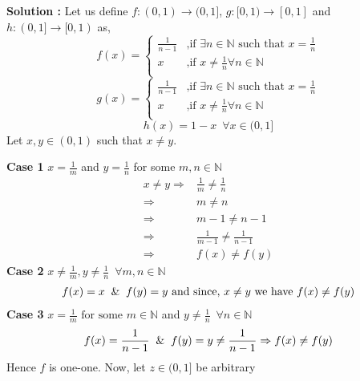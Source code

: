 \documentclass[10pt]{article}
\newcommand{\nn}{\mathbb{N}}
\begin{document}
\begin{enumerate}
    \textbf{Solution : }Let us define $f : (0, 1) \to (0, 1]$, $g : [0, 1) \to [0, 1]$ and $h: (0,1] \to [0, 1)$ as, 
    \begin{equation*}
        f(x) = 
        \begin{cases}
            \frac{1}{n-1} & \text{,if } \exists n \in \nn \text{ such that }x = \frac{1}{n}\\
            x & \text{,if } x \neq \frac{1}{n} \forall n \in \nn \\
        \end{cases}
    \end{equation*}
    \begin{equation*}
        g(x) = 
        \begin{cases}
            \frac{1}{n-1} & \text{,if } \exists n \in \nn \text{ such that }x = \frac{1}{n}\\
            x & \text{,if } x \neq \frac{1}{n} \forall n \in \nn \\
        \end{cases}
    \end{equation*}
    $$h(x) = 1 - x\,\,\, \forall x \in (0,1]$$
    Let $x, y \in (0, 1)$ such that $x \neq y$.
    
    \textbf{Case 1} $x = \frac{1}{m}$ and $y = \frac{1}{n}$ for some $m,n \in \nn$
    \begin{align*}
        x \neq y
        \Rightarrow &\frac{1}{m} \neq \frac{1}{n} \\
        \Rightarrow &m \neq n \\
        \Rightarrow &m - 1 \neq n - 1 \\
        \Rightarrow &\frac{1}{m - 1} \neq \frac{1}{n - 1} \\
        \Rightarrow &f(x) \neq f(y)
    \end{align*}
    \textbf{Case 2} $x \neq \frac{1}{m}, y \neq \frac{1}{n} \,\,\, \forall m,n \in \nn$
        \begin{align*}
            f(x) = x \And f(y) = y\text{ and since, }x \neq y \text{ we have } f(x) \neq f(y)
        \end{align*}
    \textbf{Case 3} $x = \frac{1}{m} \text{ for some } m \in \nn$ and $y \neq \frac{1}{n} \,\,\, \forall n \in \nn$
    \begin{align*}
        f(x) = \frac{1}{n - 1} \And f(y) = y \neq \frac{1}{n - 1} \Rightarrow f(x) \neq f(y)
    \end{align*}
    Hence $f$ is one-one. Now, let $z \in (0, 1]$ be arbitrary
    

\end{enumerate}
\end{document}

